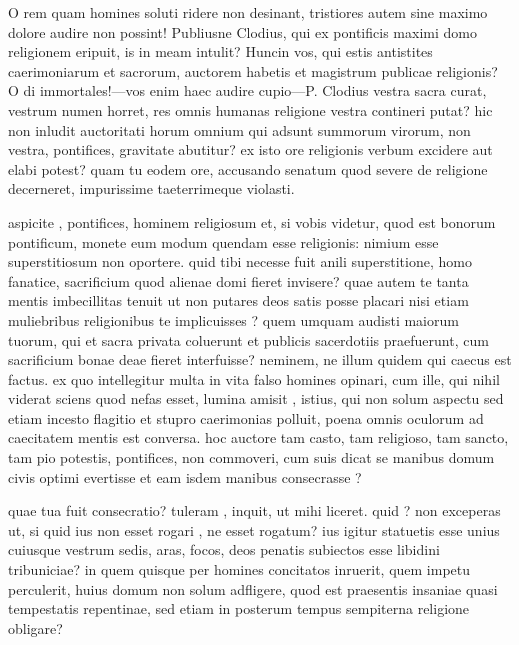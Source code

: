  O rem quam homines soluti ridere non desinant, tristiores autem sine maximo dolore audire non possint! Publiusne Clodius, qui ex pontificis maximi domo religionem eripuit, is in meam intulit? Huncin vos, qui estis antistites caerimoniarum et sacrorum, auctorem habetis et magistrum publicae religionis? O di immortales!—vos enim haec audire cupio—P. Clodius vestra sacra curat, vestrum numen horret, res omnis humanas religione vestra contineri putat? hic non inludit auctoritati horum omnium qui adsunt summorum virorum, non vestra, pontifices, gravitate abutitur? ex isto ore religionis verbum excidere aut elabi potest? quam tu eodem ore, accusando senatum quod severe de religione decerneret, impurissime taeterrimeque violasti.

 aspicite , pontifices, hominem religiosum et, si vobis videtur, quod est bonorum pontificum, monete eum modum quendam esse religionis: nimium esse superstitiosum non oportere. quid tibi necesse fuit anili superstitione, homo fanatice, sacrificium quod alienae domi fieret invisere? quae autem te tanta mentis imbecillitas tenuit ut non putares deos satis posse placari nisi etiam muliebribus religionibus te implicuisses ? quem umquam audisti maiorum tuorum, qui et sacra privata coluerunt et publicis sacerdotiis praefuerunt, cum sacrificium bonae deae fieret interfuisse? neminem, ne illum quidem qui caecus est factus. ex quo intellegitur multa in vita falso homines opinari, cum ille, qui nihil viderat sciens quod nefas esset, lumina amisit , istius, qui non solum aspectu sed etiam incesto flagitio et stupro caerimonias polluit, poena omnis oculorum ad caecitatem mentis est conversa. hoc auctore tam casto, tam religioso, tam sancto, tam pio potestis, pontifices, non commoveri, cum suis dicat se manibus domum civis optimi evertisse et eam isdem manibus consecrasse ?

 quae tua fuit consecratio? tuleram , inquit, ut mihi liceret. quid ? non exceperas ut, si quid ius non esset rogari , ne esset rogatum? ius igitur statuetis esse unius cuiusque vestrum sedis, aras, focos, deos penatis subiectos esse libidini tribuniciae? in quem quisque per homines concitatos inruerit, quem impetu perculerit, huius domum non solum adfligere, quod est praesentis insaniae quasi tempestatis repentinae, sed etiam in posterum tempus sempiterna religione obligare?

